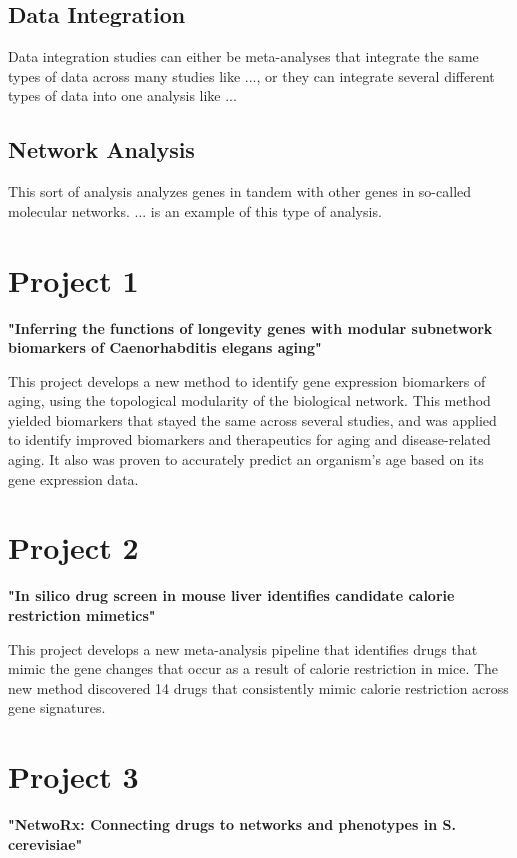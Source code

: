 \documentclass{sig-alternate-05-2015}
\begin{document}
\subsection{Data Integration}
Data integration studies can either be meta-analyses that integrate the same
types of data across many studies like ..., or they can integrate several
different types of data into one analysis like ...

\subsection{Network Analysis}
This sort of analysis analyzes genes in tandem with other genes in so-called
molecular networks. ... is an example of this type of analysis.

\section{Project 1}
\textbf{"Inferring the functions of longevity genes with modular subnetwork biomarkers of Caenorhabditis elegans aging"}
\vspace{5mm}

This project develops a new method to identify gene expression biomarkers of
aging, using the topological modularity of the biological network. This method
yielded biomarkers that stayed the same across several studies, and was applied
to identify improved biomarkers and therapeutics for aging and disease-related
aging. It also was proven to accurately predict an organism's age based on its
gene expression data.

\section{Project 2}
\textbf{"In silico drug screen in mouse liver identifies candidate calorie restriction mimetics"}
\vspace{5mm}

This project develops a new meta-analysis pipeline that identifies drugs that
mimic the gene changes that occur as a result of calorie restriction in mice.
The new method discovered 14 drugs that consistently mimic calorie restriction
across gene signatures.

\section{Project 3}
\textbf{"NetwoRx: Connecting drugs to networks and phenotypes in S. cerevisiae"}
\vspace{5mm}
\end{document}
